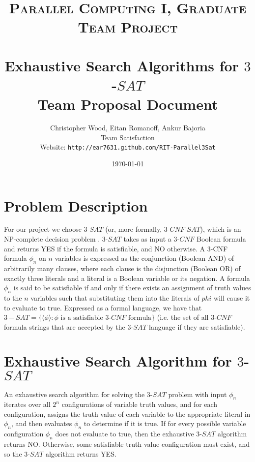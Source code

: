 \documentclass[paper=a4, fontsize=11pt]{scrartcl} %
\title{	
\normalfont \normalsize 
\textsc{Parallel Computing I, Graduate Team Project} \\ %
\horrule{2pt} \\[0.4cm] %
\vspace{-1.5em}
\huge Exhaustive Search Algorithms for $3$-$SAT$ \\ 
\Large Team Proposal Document \\
\vspace{-0.5em}
\horrule{2pt}
}
\author{Christopher Wood, Eitan Romanoff, Ankur Bajoria \\
Team Satisfaction\\
Website: {\tt http://ear7631.github.com/RIT-Parallel3Sat} } %
\date{\large \today} %
\begin{document}
\maketitle %

\vspace{-2em}
\section{Problem Description}
For our project we choose $3$-$SAT$ (or, more formally, $3$-$CNF$-$SAT$), which 
is an NP-complete decision problem \cite{algs}. $3$-$SAT$ takes as input 
a $3$-$CNF$ Boolean formula and returns YES if the formula is 
satisfiable, and NO otherwise. A 3-CNF formula $\phi_n$ on $n$ variables
is expressed as the conjunction (Boolean AND) of arbitrarily many clauses, 
where each clause is the disjunction (Boolean OR) of exactly three literals and a 
literal is a Boolean variable or its negation. A formula $\phi_n$ 
is said to be satisfiable if and only if there exists an 
assignment of truth values to the $n$ variables such that substituting them 
into the literals of $phi$ will cause it to evaluate to true. 
Expressed as a formal language, we have that 
$3-SAT = \{\langle \phi \rangle : \phi \text{ is a satisfiable }3\text{-}CNF\text{ formula} \}$
(i.e. the set of all $3$-$CNF$ formula strings that are accepted by the 
$3$-$SAT$ language if they are satisfiable).

\section{Exhaustive Search Algorithm for $3$-$SAT$}
An exhaustive search algorithm for solving the $3$-$SAT$ 
problem with input $\phi_n$ iterates over 
all $2^n$ configurations of variable truth values, and for each 
configuration, assigns the truth value of each variable 
to the appropriate literal in $\phi_n$, and then evaluates $\phi_n$ to determine if it is true. If for 
every possible variable configuration $\phi_n$ does not evaluate to 
true, then the exhaustive $3$-$SAT$ algorithm returns NO. Otherwise, 
some satisfiable truth value configuration must exist, and so the $3$-$SAT$ algorithm 
returns YES. 
\end{document}
